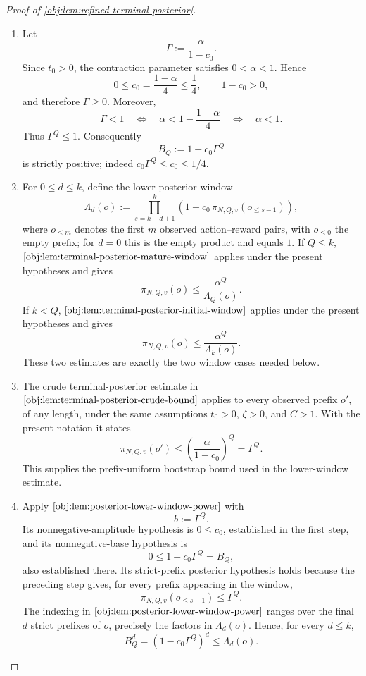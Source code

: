 \begin{proof}[Proof of \cref{obj:lem:refined-terminal-posterior}]
\begin{enumerate}
\item
Let
\[
\Gamma:=\frac{\alpha}{1-c_0}.
\]
Since \(t_0>0\), the contraction parameter satisfies \(0<\alpha<1\).  Hence
\[
0\le c_0=\frac{1-\alpha}{4}\le \frac14,
\qquad
1-c_0>0,
\]
and therefore \(\Gamma\ge0\).  Moreover,
\[
\Gamma<1
\quad\Longleftrightarrow\quad
\alpha<1-\frac{1-\alpha}{4}
\quad\Longleftrightarrow\quad
\alpha<1.
\]
Thus \(\Gamma^Q\le1\).  Consequently
\[
B_Q:=1-c_0\Gamma^Q
\]
is strictly positive; indeed \(c_0\Gamma^Q\le c_0\le1/4\). %

\item
For \(0\le d\le k\), define the lower posterior window
\[
\Lambda_d(o)
:=
\prod_{s=k-d+1}^{k}
\left(1-c_0\,\pi_{N,Q,v}(o_{\le s-1})\right),
\]
where \(o_{\le m}\) denotes the first \(m\) observed action--reward pairs, with \(o_{\le0}\) the empty prefix; for \(d=0\) this is the empty product and equals \(1\).  If \(Q\le k\), \(\cref{obj:lem:terminal-posterior-mature-window}\) applies under the present hypotheses and gives
\[
\pi_{N,Q,v}(o)
\le
\frac{\alpha^Q}{\Lambda_Q(o)}.
\]
If \(k<Q\), \(\cref{obj:lem:terminal-posterior-initial-window}\) applies under the present hypotheses and gives
\[
\pi_{N,Q,v}(o)
\le
\frac{\alpha^Q}{\Lambda_k(o)}.
\]
These two estimates are exactly the two window cases needed below. %

\item
The crude terminal-posterior estimate in \(\cref{obj:lem:terminal-posterior-crude-bound}\) applies to every observed prefix \(o'\), of any length, under the same assumptions \(t_0>0\), \(\zeta>0\), and \(C>1\).  With the present notation it states
\[
\pi_{N,Q,v}(o')
\le
\left(\frac{\alpha}{1-c_0}\right)^Q
=
\Gamma^Q.
\]
This supplies the prefix-uniform bootstrap bound used in the lower-window estimate. %

\item
Apply \(\cref{obj:lem:posterior-lower-window-power}\) with
\[
b:=\Gamma^Q.
\]
Its nonnegative-amplitude hypothesis is \(0\le c_0\), established in the first step, and its nonnegative-base hypothesis is
\[
0\le 1-c_0\Gamma^Q=B_Q,
\]
also established there.  Its strict-prefix posterior hypothesis holds because the preceding step gives, for every prefix appearing in the window,
\[
\pi_{N,Q,v}(o_{\le s-1})\le \Gamma^Q.
\]
The indexing in \(\cref{obj:lem:posterior-lower-window-power}\) ranges over the final \(d\) strict prefixes of \(o\), precisely the factors in \(\Lambda_d(o)\).  Hence, for every \(d\le k\),
\[
B_Q^d
=
\left(1-c_0\Gamma^Q\right)^d
\le
\Lambda_d(o).
\] %


\end{enumerate}
\end{proof}
